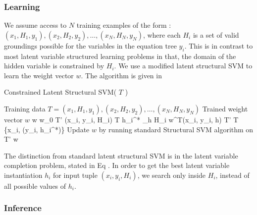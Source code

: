     \subsubsection{Learning}
      We assume access to $N$ training examples of the form : $(x_1,
      H_1, y_1), (x_2, H_2, y_2), \ldots, (x_N, H_N, y_N)$, where each
      $H_i$ is a set of valid groundings possible for the variables in
      the equation tree $y_i$. This is in contrast to most latent
      variable structured learning problems in that, the domain of the
      hidden variable is constrained by $H_i$. We use a modified
      latent structural SVM to learn the weight vector $w$. The algorithm 
      is given in 

      \begin{algorithm}
       \caption{Constrained Latent Structural SVM( $T$ )}
       \label{lssvm}
       \begin{algorithmic}[1]
         \REQUIRE Training data $T = (x_1, H_1, y_1), (x_2, H_2, y_2),
         \ldots, (x_N, H_N, y_N)$ \ENSURE Trained weight vector $w$
         \STATE w \leftarrow w_0
         \REPEAT 
           \STATE T' \leftarrow \emptyset
           \FORALL (x_i, y_i, H_i) \in T
             \STATE h_i^* \leftarrow \argmax_{h \in H_i} w^T\phi(x_i, y_i, h)
             \STATE T' \leftarrow T \cup \{x_i, (y_i, h_i^*)\}             
           \ENDFOR
           \STATE Update $w$ by running standard Structural SVM algorithm
           on T'
         \RETURN w
       \end{algorithmic}
      \end{algorithm}


      

      The distinction from standard latent structural SVM is in the latent
      variable completion problem, stated in Eq . In order to get the best 
      latent variable instantiation $h_i$ for input tuple $(x_i, y_i, H_i)$, 
      we search only inside $H_i$, instead of all possible values of $h_i$.

      

   \subsubsection{Inference}
     
      


    
    





